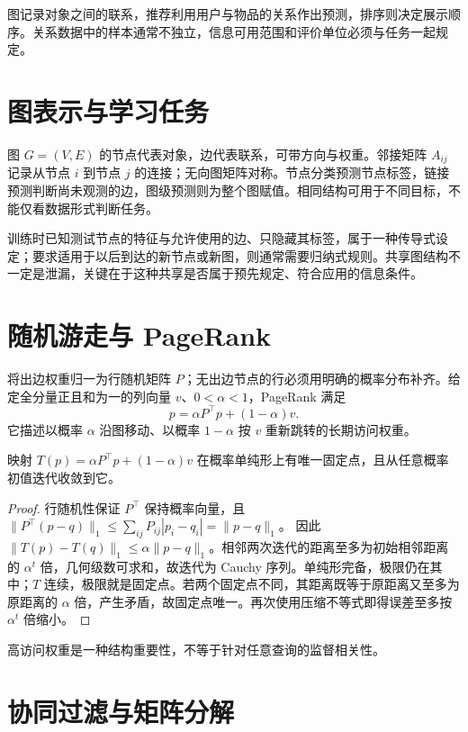 \documentclass[UTF8,12pt,a4paper,fontset=fandol]{ctexbook}
\begin{document}
图记录对象之间的联系，推荐利用用户与物品的关系作出预测，排序则决定展示顺序。关系数据中的样本通常不独立，信息可用范围和评价单位必须与任务一起规定。

\section{图表示与学习任务}

图 $G=(V,E)$ 的节点代表对象，边代表联系，可带方向与权重。邻接矩阵 $A_{ij}$ 记录从节点 $i$ 到节点 $j$ 的连接；无向图矩阵对称。节点分类预测节点标签，链接预测判断尚未观测的边，图级预测则为整个图赋值。相同结构可用于不同目标，不能仅看数据形式判断任务。

训练时已知测试节点的特征与允许使用的边、只隐藏其标签，属于一种传导式设定；要求适用于以后到达的新节点或新图，则通常需要归纳式规则。共享图结构不一定是泄漏，关键在于这种共享是否属于预先规定、符合应用的信息条件。

\section{随机游走与 PageRank}

将出边权重归一为行随机矩阵 $P$；无出边节点的行必须用明确的概率分布补齐。给定全分量正且和为一的列向量 $v$、$0<\alpha<1$，PageRank 满足
\begin{equation}
 p=\alpha P^\top p+(1-\alpha)v.
 \label{eq:ml-pagerank}
\end{equation}
它描述以概率 $\alpha$ 沿图移动、以概率 $1-\alpha$ 按 $v$ 重新跳转的长期访问权重。

\begin{proposition}
映射 $T(p)=\alpha P^\top p+(1-\alpha)v$ 在概率单纯形上有唯一固定点，且从任意概率初值迭代收敛到它。
\end{proposition}
\begin{proof}
行随机性保证 $P^\top$ 保持概率向量，且
$\|P^\top(p-q)\|_1\leq\sum_{ij}P_{ij}|p_i-q_i|=\|p-q\|_1$。
因此 $\|T(p)-T(q)\|_1\leq\alpha\|p-q\|_1$。相邻两次迭代的距离至多为初始相邻距离的 $\alpha^t$ 倍，几何级数可求和，故迭代为 Cauchy 序列。单纯形完备，极限仍在其中；$T$ 连续，极限就是固定点。若两个固定点不同，其距离既等于原距离又至多为原距离的 $\alpha$ 倍，产生矛盾，故固定点唯一。再次使用压缩不等式即得误差至多按 $\alpha^t$ 倍缩小。
\end{proof}
高访问权重是一种结构重要性，不等于针对任意查询的监督相关性。

\section{协同过滤与矩阵分解}
\end{document}
